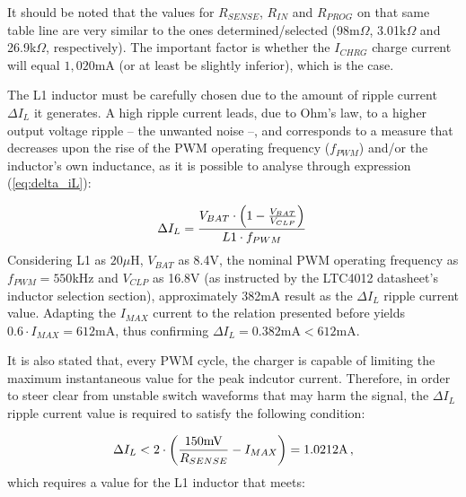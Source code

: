 It should be noted that the values for $R_{SENSE}$, $R_{IN}$ and $R_{PROG}$ on that same table line are very similar to the ones determined/selected (98m$\Omega$, 3.01k$\Omega$ and 26.9k$\Omega$, respectively). The important factor is whether the $I_{CHRG}$ charge current will equal $1,020$mA (or at least be slightly inferior), which is the case. 


The L1 inductor must be carefully chosen due to the amount of ripple current $\Delta I_L$ it generates. 
A high ripple current leads, due to Ohm's law, to a higher output voltage ripple -- the unwanted noise --, and corresponds to a measure that decreases upon the rise of the PWM operating frequency ($f_{PWM}$) and/or the inductor's own inductance, as it is possible to analyse through expression (\ref{eq:delta_iL}):

\begin{equation}\label{eq:delta_iL}
    \Delta I_L = \frac{V_{BAT} \cdot \left(1-\frac{V_{BAT}}{V_{CLP}}\right)}{L1 \cdot f_{PWM}}\,\medskip
\end{equation}
Considering L1 as $20 \mu$H, $V_{BAT}$ as 8.4V, the nominal PWM operating frequency as $f_{PWM}=550$kHz and $V_{CLP}$ as 16.8V (as instructed by the LTC4012 datasheet's inductor selection section), approximately 382mA result as the $\Delta I_L$ ripple current value. Adapting the $I_{MAX}$ current to the relation presented before yields $0.6 \cdot I_{MAX}=612$mA, thus confirming $\Delta I_L=0.382\textrm{mA} < 612$mA.

It is also stated that, every PWM cycle, the charger is capable of limiting the maximum instantaneous value for the peak indcutor current. Therefore, in order to steer clear from unstable switch waveforms that may harm the signal, the $\Delta I_L$ ripple current value is required to satisfy the following condition:

\begin{equation}\label{eq:delta_iL_2}
    \Delta I_L < 2 \cdot \left(\frac{150 \textrm{mV}}{R_{SENSE}} - I_{MAX}\right) = 1.0212\textrm{A} \,,\medskip
\end{equation}
which requires a value for the L1 inductor that meets:

